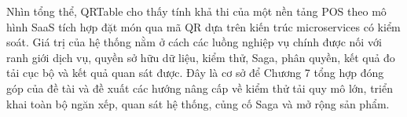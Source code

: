 Nhìn tổng thể, QRTable cho thấy tính khả thi của một nền tảng POS theo mô hình SaaS tích hợp đặt món qua mã QR dựa trên kiến trúc microservices có kiểm soát. Giá trị của hệ thống nằm ở cách các luồng nghiệp vụ chính được nối với ranh giới dịch vụ, quyền sở hữu dữ liệu, kiểm thử, Saga, phân quyền, kết quả đo tải cục bộ và kết quả quan sát được. Đây là cơ sở để Chương 7 tổng hợp đóng góp của đề tài và đề xuất các hướng nâng cấp về kiểm thử tải quy mô lớn, triển khai toàn bộ ngăn xếp, quan sát hệ thống, củng cố Saga và mở rộng sản phẩm.
